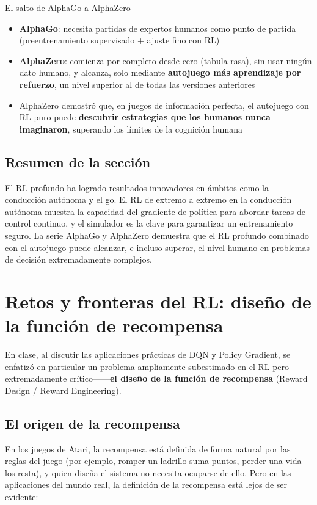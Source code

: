 \documentclass[a4paper]{article}
\begin{document}
\begin{importantbox}{El salto de AlphaGo a AlphaZero}
\begin{itemize}
    \item \textbf{AlphaGo}: necesita partidas de expertos humanos como punto de partida (preentrenamiento supervisado + ajuste fino con RL)
    \item \textbf{AlphaZero}: comienza por completo desde cero (tabula rasa), sin usar ningún dato humano, y alcanza, solo mediante \textbf{autojuego más aprendizaje por refuerzo}, un nivel superior al de todas las versiones anteriores
    \item AlphaZero demostró que, en juegos de información perfecta, el autojuego con RL puro puede \textbf{descubrir estrategias que los humanos nunca imaginaron}, superando los límites de la cognición humana
\end{itemize}
\end{importantbox}

\subsection{Resumen de la sección}

El RL profundo ha logrado resultados innovadores en ámbitos como la conducción autónoma y el go. El RL de extremo a extremo en la conducción autónoma muestra la capacidad del gradiente de política para abordar tareas de control continuo, y el simulador es la clave para garantizar un entrenamiento seguro. La serie AlphaGo y AlphaZero demuestra que el RL profundo combinado con el autojuego puede alcanzar, e incluso superar, el nivel humano en problemas de decisión extremadamente complejos.

\section{Retos y fronteras del RL: diseño de la función de recompensa}

En clase, al discutir las aplicaciones prácticas de DQN y Policy Gradient, se enfatizó en particular un problema ampliamente subestimado en el RL pero extremadamente crítico------\textbf{el diseño de la función de recompensa} (Reward Design / Reward Engineering).

\subsection{El origen de la recompensa}

En los juegos de Atari, la recompensa está definida de forma natural por las reglas del juego (por ejemplo, romper un ladrillo suma puntos, perder una vida los resta), y quien diseña el sistema no necesita ocuparse de ello. Pero en las aplicaciones del mundo real, la definición de la recompensa está lejos de ser evidente:
\end{document}
